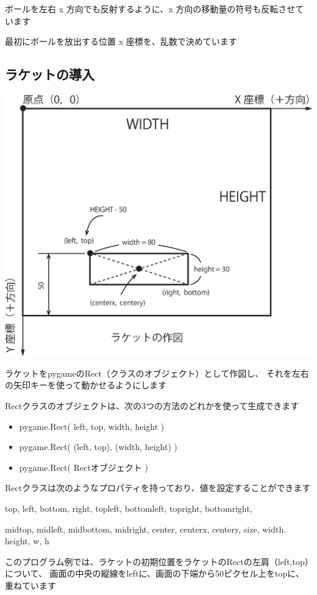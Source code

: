 \documentclass[uplatex,a4paper,11pt,oneside,openany]{jsbook}
\begin{document}
ボールを左右 x 方向でも反射するように、x 方向の移動量の符号も反転させています

最初にボールを放出する位置 x 座標を、乱数で決めています



\subsection{ラケットの導入}

\begin{center}
\includegraphics[width=0.5\hsize]{./figure/pg11.eps}
\end{center}

ラケットをpygameのRect（クラスのオブジェクト）として作図し、
それを左右の矢印キーを使って動かせるようにします

Rectクラスのオブジェクトは、次の3つの方法のどれかを使って生成できます

\begin{itemize}
\item pygame.Rect( left, top, width, height )
\item pygame.Rect( (left, top), (width, height) )
\item pygame.Rect( Rectオブジェクト )
\end{itemize}

Rectクラスは次のようなプロパティを持っており、値を設定することができます

top, left, bottom, right,
topleft, bottomleft, topright, bottomright,

midtop, midleft, midbottom, midright,
center, centerx, centery, size, width. height, w, h

このプログラム例では、ラケットの初期位置をラケットのRectの左肩（left,top）について、
画面の中央の縦線をleftに、画面の下端から50ピクセル上をtopに、重ねています
\end{document}
